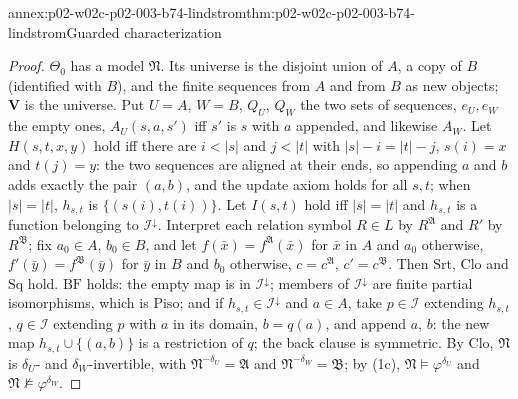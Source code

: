 \begin{annexitem}{annex:p02-w02c-p02-003-b74-lindstrom}{thm:p02-w02c-p02-003-b74-lindstrom}{Guarded characterization}
\begin{proof}
\(\Theta_0\) has a model \(\mathfrak N\).  Its universe is the disjoint
union of \(A\), a copy of \(B\) (identified with \(B\)), and the finite
sequences from \(A\) and from \(B\) as new objects; \(\mathbf V\) is the
universe.  Put \(U=A\), \(W=B\), \(Q_U\), \(Q_W\) the two sets of
sequences, \(e_U,e_W\) the empty ones, \(A_U(s,a,s')\) iff \(s'\) is \(s\)
with \(a\) appended, and likewise \(A_W\).  Let \(H(s,t,x,y)\) hold iff
there are \(i<\lvert s\rvert\) and \(j<\lvert t\rvert\) with
\(\lvert s\rvert-i=\lvert t\rvert-j\), \(s(i)=x\) and \(t(j)=y\): the two
sequences are aligned at their ends, so appending \(a\) and \(b\) adds
exactly the pair \((a,b)\), and the update axiom holds for all \(s,t\);
when \(\lvert s\rvert=\lvert t\rvert\), \(h_{s,t}\) is
\(\{(s(i),t(i))\}\).  Let \(I(s,t)\) hold iff \(\lvert s\rvert=\lvert
t\rvert\) and \(h_{s,t}\) is a function belonging to
\(\mathcal I^{\downarrow}\).  Interpret each relation symbol \(R\in L\) by
\(R^{\mathfrak A}\) and \(R'\) by \(R^{\mathfrak B}\); fix \(a_0\in A\),
\(b_0\in B\), and let \(f(\bar x)=f^{\mathfrak A}(\bar x)\) for \(\bar x\)
in \(A\) and \(a_0\) otherwise, \(f'(\bar y)=f^{\mathfrak B}(\bar y)\) for
\(\bar y\) in \(B\) and \(b_0\) otherwise, \(c=c^{\mathfrak A}\),
\(c'=c^{\mathfrak B}\).  Then \(\mathrm{Srt}\), \(\mathrm{Clo}\) and
\(\mathrm{Sq}\) hold.  \(\mathrm{BF}\) holds: the empty map is in
\(\mathcal I^{\downarrow}\); members of \(\mathcal I^{\downarrow}\) are
finite partial isomorphisms, which is \(\mathrm{Piso}\); and if
\(h_{s,t}\in\mathcal I^{\downarrow}\) and \(a\in A\), take \(p\in\mathcal
I\) extending \(h_{s,t}\), \(q\in\mathcal I\) extending \(p\) with \(a\) in
its domain, \(b=q(a)\), and append \(a\), \(b\): the new map
\(h_{s,t}\cup\{(a,b)\}\) is a restriction of \(q\); the back clause is
symmetric.  By \(\mathrm{Clo}\), \(\mathfrak N\) is \(\delta_U\)- and
\(\delta_W\)-invertible, with \(\mathfrak N^{-\delta_U}=\mathfrak A\) and
\(\mathfrak N^{-\delta_W}=\mathfrak B\); by (1c),
\(\mathfrak N\models\varphi^{\delta_U}\) and \(\mathfrak
N\not\models\varphi^{\delta_W}\).


\end{proof}
\end{annexitem}
